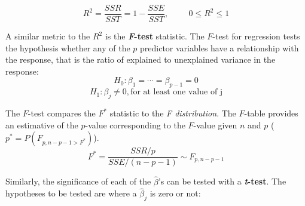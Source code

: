 \documentclass[12pt]{article}
\begin{document}
{%




\begin{equation}
  R^{2}= \frac{SSR}{SST}=1-\frac{SSE}{SST}, \hspace{1cm} 0 \leq R^{2} \leq 1
\end{equation}



\vspace{0.5cm}
A similar metric to the $R^{2}$ is the \textbf{\textit{F}-test} statistic. The $F$-test for regression tests the hypothesis whether any of the $p$ predictor variables have a relationship with the response, that is the ratio of explained to unexplained variance in the response:
\[
  H_{0}: \beta_{1} = \cdots = \beta_{p-1} = 0\]
\[ H_{1}: \beta_{j}  \neq 0, \text{for at least one value of j}
\]

The $F$-test compares the $F^{*}$ statistic to the \textit{F distribution}. The $F$-table \cite{Ftable} provides an estimative of the $p$-value corresponding to the $F$-value given $n$ and $p$ ($p^{*}=P(F_{p,n-p-1>F^{*}})$). 
\vspace{0.5cm}
\begin{equation}
F^{*} = \frac{SSR/p}{SSE/(n-p-1)} \sim F_{p,n-p-1}
\end{equation}

Similarly, the significance of each of the $\hat \beta$'s can be tested with a \textbf{\textit{t}-test}. The hypotheses to be tested are where a $\hat \beta_{j}$ is zero or not:

}
\end{document}
